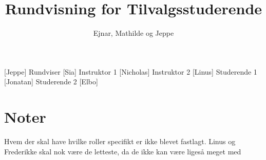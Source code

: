 \documentclass[a4paper,11pt]{article}
\title{Rundvisning for Tilvalgsstuderende}
\author{Ejnar, Mathilde og Jeppe}
\begin{document}
\maketitle

\begin{roles}
[Jeppe] Rundviser
[Sia] Instruktor 1
[Nicholas] Instruktor 2
[Linus] Studerende 1 
[Jonatan] Studerende 2 
[Elbo]
\end{roles} 

\section*{Noter}
Hvem der skal have hvilke roller specifikt er ikke blevet fastlagt. Linus og Frederikke skal nok være de letteste, da de ikke kan være ligeså meget med
\begin{props}







\end{props}
\end{document}
